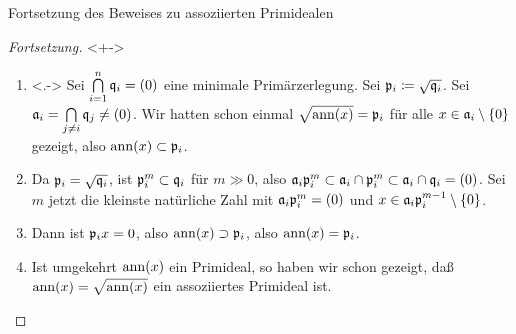 \begin{frame}{Fortsetzung des Beweises zu assoziierten Primidealen}
	\begin{proof}[Fortsetzung]<+->
		\begin{enumerate}[<+->]
		\item<.->
			Sei \(\bigcap\limits_{i = 1}^n \mathfrak{q}_i = (0)\) eine minimale Primärzerlegung. Sei \(\mathfrak{p}_i
			\coloneqq \sqrt{\mathfrak{q}_i}\). Sei \(\mathfrak{a}_i = \bigcap\limits_{j \neq i} \mathfrak{q}_j \neq (0)\).
			Wir hatten schon einmal \(\sqrt{\operatorname{ann}(x)} = \mathfrak{p}_i\) für alle \(x \in \mathfrak{a}_i \setminus \{0\}\)
			gezeigt, also \(\operatorname{ann}(x) \subset \mathfrak{p}_i\).%
		\item
			Da \(\mathfrak{p}_i = \sqrt{\mathfrak{q}_i}\), ist \(\mathfrak{p}_i^m \subset \mathfrak{q}_i\) für \(m \gg 0\),
			also \(\mathfrak{a}_i \mathfrak{p}_i^m \subset \mathfrak{a}_i \cap \mathfrak{p}_i^m \subset \mathfrak{a}_i \cap \mathfrak{q}_i = (0)\).
			Sei \(m\) jetzt die kleinste natürliche Zahl mit \(\mathfrak{a}_i \mathfrak{p}_i^m = (0)\) und \(x \in \mathfrak{a}_i
			\mathfrak{p}_i^{m - 1} \setminus \{0\}\).
		\item
			Dann ist \(\mathfrak{p}_i x = 0\), also \(\operatorname{ann}(x) \supset \mathfrak{p}_i \), also \(\operatorname{ann}(x) = \mathfrak{p}_i\).
		\item
			Ist umgekehrt \(\operatorname{ann}(x)\) ein Primideal, so haben wir schon gezeigt, daß \(\operatorname{ann}(x) = \sqrt{\operatorname{ann}(x)}\) ein
			assoziiertes Primideal ist.
			\qedhere
		\end{enumerate}
	\end{proof}
\end{frame}

